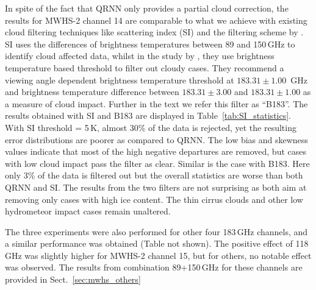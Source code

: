 \documentclass[amt, manuscript]{copernicus}
\begin{document}
In spite of the fact that QRNN only provides a partial cloud correction, the results for  MWHS-2 channel 14 are comparable to what we achieve with existing cloud filtering techniques like scattering index (SI) and the filtering scheme by \citet{buehler:aclou:07}. SI uses the differences of brightness temperatures between 89 and 150\,GHz to identify cloud affected data, whilst in the study by \citet{buehler:aclou:07}, they use brightness temperature based threshold to filter out cloudy cases. They recommend a viewing angle dependent brightness temperature threshold at $183.31\pm1.00$ \,GHz and brightness temperature difference between $183.31\pm3.00$ and $183.31\pm 1.00$ as a measure of cloud impact. Further in the text we refer this filter as ``B183''. The results obtained with SI and B183 are displayed in Table~\ref{tab:SI_statistics}. With SI threshold = 5\,K, almost 30\% of the data is rejected, yet the resulting error distributions are poorer as compared to QRNN. The low bias and skewness values indicate that most of the high negative departures are removed, but cases with low cloud impact pass the filter as clear. Similar is the case with B183. Here only 3\% of the data is filtered out but the overall statistics are worse than both QRNN and SI. The results from the two filters are not surprising as both aim at removing only cases with high ice content. The thin cirrus clouds and other low hydrometeor impact cases remain unaltered.

The three experiments were also performed for other four 183\,GHz channels, and a similar performance was obtained (Table not shown). The positive effect of 118\,GHz was slightly higher for MWHS-2 channel 15, but for others, no notable effect was observed. The results from combination 89+150\,GHz for these channels are provided in Sect.~\ref{sec:mwhs_others} 
\end{document}
